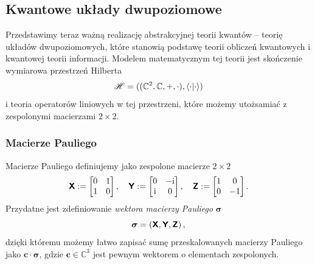 \documentclass{myclass}
\begin{document}
\subsection{Kwantowe układy dwupoziomowe}

Przedstawimy teraz ważną realizację abstrakcyjnej teorii kwantów -- teorię układów dwupoziomowych,
które stanowią podstawę teorii obliczeń kwantowych i kwantowej teorii informacji. Modelem
matematycznym tej teorii jest skończenie wymiarowa przestrzeń Hilberta
\begin{equation*}
    \mathscr{H} = ((\mathbb{C}^2, \mathbb{C}, +, \cdot), \braket{\cdot})
\end{equation*}
i teoria operatorów liniowych w tej przestrzeni, które możemy utożsamiać z zespolonymi macierzami
\(2\times 2\).

\subsubsection{Macierze Pauliego}

Macierze Pauliego definiujemy jako zespolone macierze \(2\times 2\)
\begin{equation*}
    \oper{X} := \mqty[0 & 1 \\ 1 & 0]\,,\quad \oper{Y} := \mqty[0 & -\im \\ \im & 0]\,,\quad \oper{Z} := \mqty[1 & 0 \\ 0 & -1]\,.
\end{equation*}
Przydatne jest zdefiniowanie \textit{wektora macierzy Pauliego} \(\boldsymbol{\sigma}\)
\begin{equation*}
    \boldsymbol{\sigma} = (\boldsymbol{\mathsf{X}}, \boldsymbol{\mathsf{Y}}, \boldsymbol{\mathsf{Z}})\,,
\end{equation*}
dzięki któremu możemy łatwo zapisać sumę przeskalowanych macierzy Pauliego jako
\(\mathbf{c}\cdot\boldsymbol{\sigma}\), gdzie \(\mathbf{c}\in\mathbb{C}^3\) jest pewnym wektorem o
elementach zespolonych.
\end{document}
